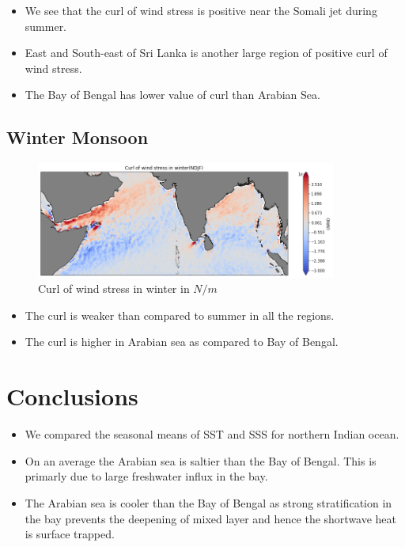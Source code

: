 \documentclass[20pt]{article}
\begin{document}
\begin{itemize}
    \item We see that the curl of wind stress is positive near the Somali jet during summer.
    \item East and South-east of Sri Lanka is another large region of positive curl of wind stress. 
    \item The Bay of Bengal has lower value of curl than Arabian Sea.
\end{itemize}

\subsection*{Winter Monsoon}

\begin{figure}
    \centering
    \includegraphics[width=0.88\textwidth]{curl_winter.png}
    \caption{Curl of wind stress in winter in $N/m$}
\end{figure}

\begin{itemize}
    \item The curl is weaker than compared to summer in all the regions.
    \item The curl is higher in Arabian sea as compared to Bay of Bengal.
\end{itemize}

\section*{Conclusions}

\begin{itemize}
    \item We compared the seasonal means of SST and SSS for northern Indian ocean.
    \item On an average the Arabian sea is saltier than the Bay of Bengal. This is primarly due to large freshwater influx in the bay.
    \item The Arabian sea is cooler than the Bay of Bengal as strong stratification in the bay prevents the deepening of mixed layer and hence the shortwave heat is surface trapped.
\end{itemize}
\end{document}
